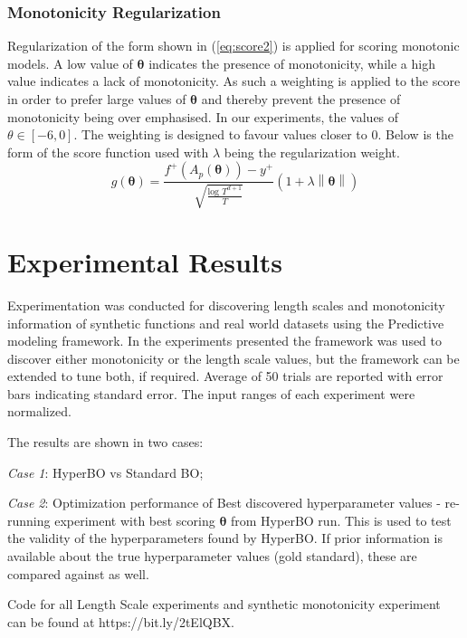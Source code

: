 \documentclass{article}
\begin{document}
\subsubsection{Monotonicity Regularization}
Regularization of the form shown in (\ref{eq:score2}) is applied for scoring monotonic models. A low value of $\boldsymbol{\theta}$ indicates the presence of monotonicity, while a high value indicates a lack of monotonicity. As such a weighting is applied to the score in order to prefer large values of $\boldsymbol{\theta}$ and thereby prevent the presence of monotonicity being over emphasised. In our experiments, the values of $\theta \in [-6, 0]$. The weighting is designed to favour values closer to 0. Below is the form of the score function used with $\lambda$ being the regularization weight.
\begin{equation}\label{eq:score2}
g(\boldsymbol{\theta}) = \frac{f^{+}(A_{p}(\boldsymbol{\theta}))-y^{+}}{\sqrt{\frac{\text{log } T^{d+1}}{T}}}\left(1+\lambda\left\|\boldsymbol{\theta}\right\|\right)
\end{equation}

\section{Experimental Results}

Experimentation was conducted for discovering length scales and monotonicity information of synthetic functions and real world datasets using the Predictive modeling framework. In the experiments presented the framework was used to discover either monotonicity or the length scale values, but the framework can be extended to tune both, if required. Average of 50 trials are reported with error bars indicating standard error. The input ranges of each experiment were normalized. 

The results are shown in two cases: 

\textit{Case 1}: HyperBO vs Standard BO; 

\textit{Case 2}: Optimization performance of Best discovered hyperparameter values - re-running experiment with best scoring $\boldsymbol{\theta}$ from HyperBO run. This is used to test the validity of the hyperparameters found by HyperBO. If prior information is available about the true hyperparameter values (gold standard), these are compared against as well.

Code for all Length Scale experiments and synthetic monotonicity experiment can be found at https://bit.ly/2tElQBX. 
\end{document}
